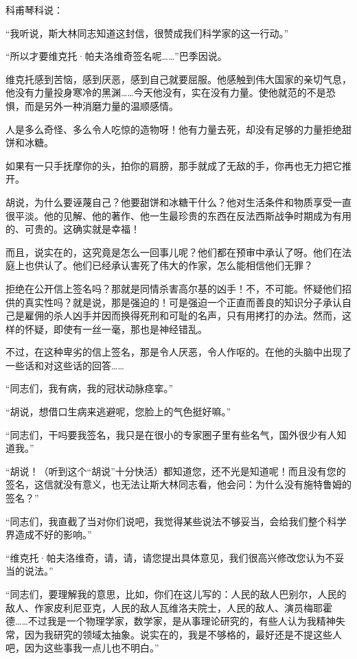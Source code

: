 科甫琴科说：

“我听说，斯大林同志知道这封信，很赞成我们科学家的这一行动。”

“所以才要维克托·帕夫洛维奇签名呢……”巴季因说。

维克托感到苦恼，感到厌恶，感到自己就要屈服。他感触到伟大国家的亲切气息，他没有力量投身寒冷的黑渊……今天他没有，实在没有力量。使他就范的不是恐惧，而是另外一种消磨力量的温顺感情。

人是多么奇怪、多么令人吃惊的造物呀！他有力量去死，却没有足够的力量拒绝甜饼和冰糖。

如果有一只手抚摩你的头，拍你的肩膀，那手就成了无敌的手，你再也无力把它推开。

胡说，为什么要诬蔑自己？他要甜饼和冰糖干什么？他对生活条件和物质享受一直很平淡。他的见解、他的著作、他一生最珍贵的东西在反法西斯战争时期成为有用的、可贵的。这确实就是幸福！

而且，说实在的，这究竟是怎么一回事儿呢？他们都在预审中承认了呀。他们在法庭上也供认了。他们已经承认害死了伟大的作家，怎么能相信他们无罪？

拒绝在公开信上签名吗？那就是同情杀害高尔基的凶手！不，不可能。怀疑他们招供的真实性吗？就是说，那是强迫的！可是强迫一个正直而善良的知识分子承认自己是雇佣的杀人凶手并因而换得死刑和可耻的名声，只有用拷打的办法。然而，这样的怀疑，即使有一丝一毫，那也是神经错乱。

不过，在这种卑劣的信上签名，那是令人厌恶，令人作呕的。在他的头脑中出现了一些话和对这些话的回答……

“同志们，我有病，我的冠状动脉痉挛。”

“胡说，想借口生病来逃避呢，您脸上的气色挺好嘛。”

“同志们，干吗要我签名，我只是在很小的专家圈子里有些名气，国外很少有人知道我。”

“胡说！（听到这个“胡说”十分快活）都知道您，还不光是知道呢！而且没有您的签名，这信就没有意义，也无法让斯大林同志看，他会问：为什么没有施特鲁姆的签名？”

“同志们，我直截了当对你们说吧，我觉得某些说法不够妥当，会给我们整个科学界造成不好的影响。”

“维克托·帕夫洛维奇，请，请，请您提出具体意见，我们很高兴修改您认为不妥当的说法。”

“同志们，要理解我的意思，比如，你们在这儿写的：人民的敌人巴别尔，人民的敌人、作家皮利尼亚克，人民的敌人瓦维洛夫院士，人民的敌人、演员梅耶霍德……不过我是一个物理学家，数学家，是从事理论研究的，有些人认为我精神失常，因为我研究的领域太抽象。说实在的，我是不够格的，最好还是不提这些人吧，因为这些事我一点儿也不明白。”

